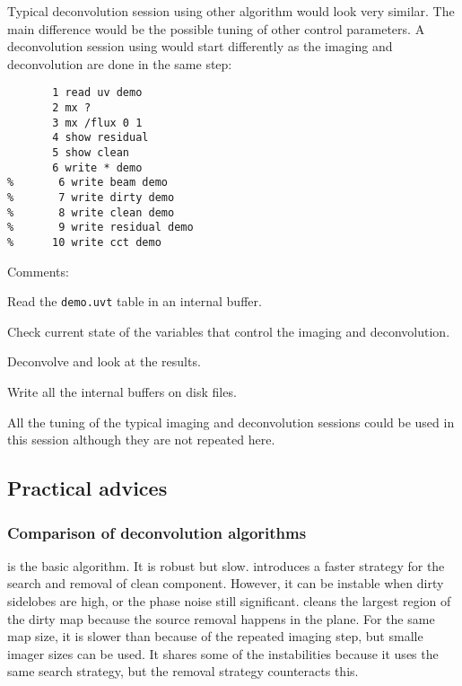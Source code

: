 Typical deconvolution session using other \clean{} algorithm would look
very similar. The main difference would be the possible tuning of other
control parameters. A deconvolution session using  would start
differently as the imaging and deconvolution are done in the same step:
\begin{verbatim}
       1 read uv demo
       2 mx ?
       3 mx /flux 0 1
       4 show residual
       5 show clean
       6 write * demo
%       6 write beam demo
%       7 write dirty demo
%       8 write clean demo
%       9 write residual demo
%      10 write cct demo
\end{verbatim}
Comments:
\begin{description}\itemsep 0pt
\item[Step 1] Read the \texttt{demo.uvt} \uv{} table in an internal buffer.
\item[Step 2] Check current state of the variables that control the
  imaging and deconvolution.
\item[Steps 3-5] Deconvolve and look at the results.
\item[Steps 6-10] Write all the internal buffers on disk files. 
\end{description}
All the tuning of the typical imaging and deconvolution sessions could be
used in this  session although they are not repeated here.

\subsection{Practical advices}
\label{sub:single:advice}

\subsubsection{Comparison of deconvolution algorithms}

 is the basic \clean{} algorithm. It is robust but slow. 
 introduces a faster strategy for the search and removal of 
clean component. However, it can be instable when dirty sidelobes are 
high, or the phase noise still significant.  cleans the largest 
region of the dirty map because the source removal happens in the \uv{} 
plane. For the same map size, it is slower than  because of 
the repeated imaging step, but smalle imager sizes can be used.
It shares some of the   instabilities because it uses 
the same search strategy, but the removal strategy counteracts this.

